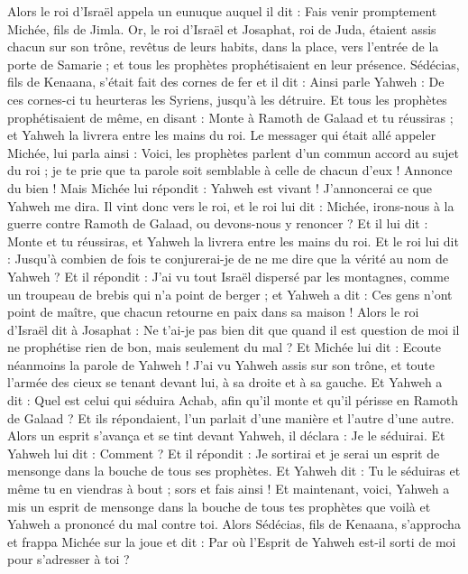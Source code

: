 \begin{multicols}{2}
Alors le roi d'Israël appela un eunuque auquel il dit : Fais venir promptement Michée, fils de Jimla.
Or, le roi d'Israël et Josaphat, roi de Juda, étaient assis chacun sur son trône, revêtus de leurs habits, dans la place, vers l'entrée de la porte de Samarie ; et tous les prophètes prophétisaient en leur présence.
Sédécias, fils de Kenaana, s'était fait des cornes de fer et il dit : Ainsi parle Yahweh : De ces cornes-ci tu heurteras les Syriens, jusqu'à les détruire.
Et tous les prophètes prophétisaient de même, en disant : Monte à Ramoth de Galaad et tu réussiras ; et Yahweh la livrera entre les mains du roi.
Le messager qui était allé appeler Michée, lui parla ainsi : Voici, les prophètes parlent d'un commun accord au sujet du roi ; je te prie que ta parole soit semblable à celle de chacun d’eux ! Annonce du bien !
Mais Michée lui répondit : Yahweh est vivant ! J’annoncerai ce que Yahweh me dira.
Il vint donc vers le roi, et le roi lui dit : Michée, irons-nous à la guerre contre Ramoth de Galaad, ou devons-nous y renoncer ? Et il lui dit : Monte et tu réussiras, et Yahweh la livrera entre les mains du roi.
Et le roi lui dit : Jusqu'à combien de fois te conjurerai-je de ne me dire que la vérité au nom de Yahweh ?
Et il répondit : J'ai vu tout Israël dispersé par les montagnes, comme un troupeau de brebis qui n'a point de berger ; et Yahweh a dit : Ces gens n’ont point de maître, que chacun retourne en paix dans sa maison !
Alors le roi d'Israël dit à Josaphat : Ne t'ai-je pas bien dit que quand il est question de moi il ne prophétise rien de bon, mais seulement du mal ?
Et Michée lui dit : Ecoute néanmoins la parole de Yahweh ! J'ai vu Yahweh assis sur son trône, et toute l'armée des cieux se tenant devant lui, à sa droite et à sa gauche.
Et Yahweh a dit : Quel est celui qui séduira Achab, afin qu'il monte et qu'il périsse en Ramoth de Galaad ? Et ils répondaient, l'un parlait d'une manière et l'autre d'une autre.
Alors un esprit s'avança et se tint devant Yahweh, il déclara : Je le séduirai. Et Yahweh lui dit : Comment ?
Et il répondit : Je sortirai et je serai un esprit de mensonge dans la bouche de tous ses prophètes. Et Yahweh dit : Tu le séduiras et même tu en viendras à bout ; sors et fais ainsi !
Et maintenant, voici, Yahweh a mis un esprit de mensonge dans la bouche de tous tes prophètes que voilà et Yahweh a prononcé du mal contre toi.
Alors Sédécias, fils de Kenaana, s'approcha et frappa Michée sur la joue et dit : Par où l'Esprit de Yahweh est-il sorti de moi pour s'adresser à toi ?

\end{multicols}
